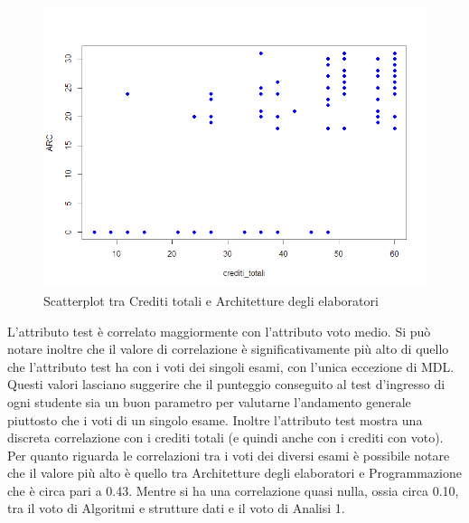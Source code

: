 \documentclass[12pt]{article}
\begin{document}
\begin{figure}[H]
	\includegraphics[width=\textwidth]{img/creditiArc.png}
	\caption{Scatterplot tra Crediti totali e Architetture degli elaboratori}
\end{figure}

L'attributo test è correlato maggiormente con l'attributo voto medio. 
Si può notare inoltre che il valore di correlazione è significativamente più alto di quello che l'attributo test ha con i voti dei singoli esami, con l'unica eccezione di MDL.
Questi valori lasciano suggerire che il punteggio conse\-guito al test d'ingresso di ogni studente sia un buon parametro per valutar\-ne l'andamento generale piuttosto che i voti di un singolo esame.
Inoltre l'attributo test mostra una discreta correlazione con i crediti totali (e quindi anche con i crediti con voto).
Per quanto riguarda le correlazioni tra i voti dei diversi esami è possibi\-le notare che il valore più alto è quello tra Architetture degli elaboratori e Programmazione che è circa pari a 0.43.
Mentre si ha una correlazione quasi nulla, ossia circa 0.10, tra il voto di Algoritmi e strutture dati e il voto di Analisi 1.
\end{document}
